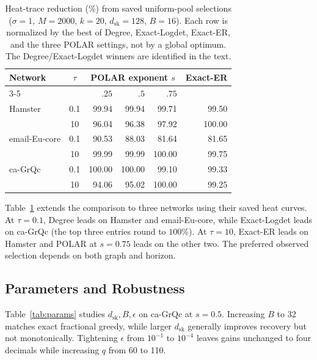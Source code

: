 \documentclass[conference]{IEEEtran}
\theoremstyle{definition}
\newcommand{\POLAR}{\textsc{POLAR}}
\newcommand{\dsk}{d_{\mathrm{sk}}}
\begin{document}
\begin{table}[t]
\centering
\caption{Heat-trace reduction (\%) from saved uniform-pool selections
($\sigma=1$, $M=2000$, $k=20$, $\dsk=128$, $B=16$).
Each row is normalized by the best of Degree, Exact-Logdet,
Exact-ER, and the three \POLAR{} settings, not by a global optimum.
The Degree/Exact-Logdet winners are identified in the text.}
\label{tab:heat-two-horizons}
\footnotesize
\begin{tabular}{@{}lcrrrr@{}}
\toprule
Network & $\tau$ & \multicolumn{3}{c}{\POLAR{} exponent $s$} & Exact-ER\\
\cmidrule(lr){3-5}
 & & $.25$ & $.5$ & $.75$ &\\
\midrule
Hamster & 0.1 & 99.94 & 99.94 & 99.71 & 99.50\\
 & 10 & 96.04 & 96.38 & 97.92 & 100.00\\
email-Eu-core & 0.1 & 90.53 & 88.03 & 81.64 & 81.65\\
 & 10 & 99.99 & 99.99 & 100.00 & 99.75\\
ca-GrQc & 0.1 & 100.00 & 100.00 & 99.10 & 99.33\\
 & 10 & 94.06 & 95.02 & 100.00 & 99.25\\
\bottomrule
\end{tabular}
\end{table}

Table~\ref{tab:heat-two-horizons} extends the comparison to three
networks using their saved heat curves. At $\tau=0.1$, Degree leads
on Hamster and email-Eu-core, while Exact-Logdet leads on ca-GrQc
(the top three entries round to $100\%$). At $\tau=10$, Exact-ER
leads on Hamster and \POLAR{} at $s=0.75$ leads on the other two.
The preferred observed selection depends on both graph and horizon.

\subsection{Parameters and Robustness}
\label{sec:exp-params}

Table~\ref{tab:params} studies $\dsk,B,\epsilon$ on ca-GrQc at $s=0.5$.
Increasing $B$ to 32 matches exact fractional greedy, while larger $\dsk$
generally improves recovery but not monotonically. Tightening $\epsilon$
from $10^{-1}$ to $10^{-4}$ leaves gains unchanged to four decimals
while increasing $q$ from 60 to 110. 
\end{document}
